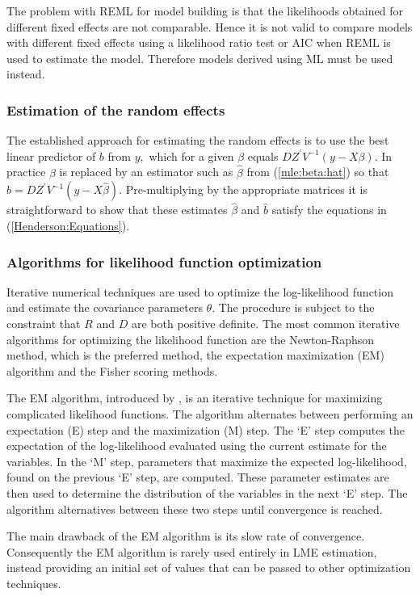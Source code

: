 \documentclass[12pt, a4paper]{report}
\theoremstyle{plain}
\theoremstyle{definition}
\theoremstyle{remark}
\begin{document}
The problem with REML for model building is that the likelihoods obtained for different fixed effects are not comparable. Hence it is not valid to compare models with different fixed effects using a likelihood ratio test or AIC when REML is used to
estimate the model. Therefore models derived using ML must be used instead.

\subsubsection{Estimation of the random effects}

The established approach for estimating the random effects is to use the best linear predictor of $b$ from $y,$ which for a given $\beta$ equals $DZ^\prime V^{-1}(y - X \beta).$ In practice $\beta$ is replaced by an estimator such as $\hat{\beta}$ from (\ref{mle:beta:hat}) so that $\hat{b} = DZ^\prime V^{-1}(y - X \hat{\beta}).$ Pre-multiplying by the appropriate matrices it is straightforward to show that these estimates $\hat{\beta}$ and $\hat{b}$ satisfy the equations in (\ref{Henderson:Equations}).

\subsubsection{Algorithms for likelihood function optimization}Iterative numerical techniques are used to optimize the log-likelihood function and estimate the covariance parameters $\theta$. The procedure is subject to the constraint that $R$ and $D$ are both positive definite. The most common iterative algorithms for optimizing the likelihood function are the Newton-Raphson method, which is the preferred method, the expectation maximization (EM) algorithm and the Fisher scoring methods.

The EM algorithm, introduced by \citet{EM}, is an iterative technique for maximizing complicated likelihood functions. The algorithm alternates between performing an expectation (E) step
and the maximization (M) step. The `E' step computes the expectation of the log-likelihood evaluated using the current
estimate for the variables. In the `M' step, parameters that maximize the expected log-likelihood, found on the previous `E' step, are computed. These parameter estimates are then used to determine the distribution of the variables in the next `E' step. The algorithm alternatives between these two steps until convergence is reached.

The main drawback of the EM algorithm is its slow rate of
convergence. Consequently the EM algorithm is rarely used entirely in LME estimation,
instead providing an initial set of values that can be passed to
other optimization techniques.
\end{document}
